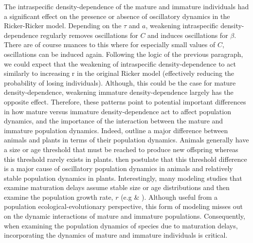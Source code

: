 \documentclass{article}
\numberwithin{theorem}{section}
\begin{document}
{The intraspecific density-dependence of the mature and immature individuals had a significant effect on the presence or absence of oscillatory dynamics in the Ricker-Ricker model. Depending on the $\tau$ and $a$, weakening intraspecific density-dependence regularly removes oscillations for $C$ and induces oscillations for $\beta$. There are of course nuances to this where for especially small values of $C$, oscillations can be induced again. Following the logic of the previous paragraph, we could expect that the weakening of intraspecific density-dependence to act similarly to increasing r in the original Ricker model (effectively reducing the probability of losing individuals). Although, this could be the case for mature density-dependence, weakening immature density-dependence largely has the opposite effect. Therefore, these patterns point to potential important differences in how mature versus immature density-dependence act to affect population dynamics, and the importance of the interaction between the mature and immature population dynamics. Indeed, \cite{reesGrowthReproductionPopulation1989} outline  a major difference between animals and plants in terms of their population dynamics. Animals generally have a size or age threshold that must be reached to produce new offspring whereas this threshold rarely exists in plants. \cite{reesGrowthReproductionPopulation1989} then postulate that this threshold difference is a major cause of oscillatory population dynamics in animals and relatively stable population dynamics in plants. Interestingly, many modeling studies that examine maturation delays assume stable size or age distributions and then examine the population growth rate, $r$ (e.g \cite{stearnsEvolutionPhenotypicPlasticity1986} \& \cite{takadaOptimalSizeMaturity1997}). Although useful from a population ecological-evolutionary perspective, this form of modeling misses out on the dynamic interactions of mature and immature populations. Consequently, when examining the population dynamics of species due to maturation delays, incorporating the dynamics of mature and immature individuals is critical.

}
\end{document}
